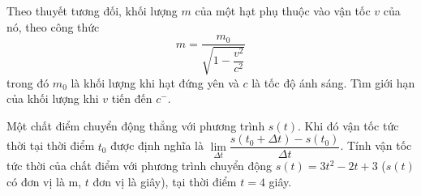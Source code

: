 \begin{vd}%
	Theo thuyết tương đối, khối lượng $m$ của một hạt phụ thuộc vào vận tốc $v$ của nó, theo công thức
	$$
	m=\frac{m_0}{\sqrt{1-\dfrac{v^2}{c^2}}}
	$$
	trong đó $m_0$ là khối lượng khi hạt đứng yên và $c$ là tốc độ ánh sáng. Tìm giới hạn của khối lượng khi $v$ tiến đến $c^{-}$.
\end{vd}

\begin{vd}%
	Một chất điểm chuyển động thẳng với phương trình $s(t)$. Khi đó vận tốc tức thời tại thời điểm $t_0$ được định nghĩa là $\displaystyle \lim \limits_{\Delta t} \dfrac{s(t_0+ \Delta t) - s(t_0)}{\Delta t}$. Tính vận tốc tức thời của chất điểm với phương trình chuyển động $s(t) = 3t^2-2t+3$ ($s(t)$ có đơn vị là m, $t$ đơn vị là giây), tại thời điểm $t=4$ giây. 
\end{vd}

